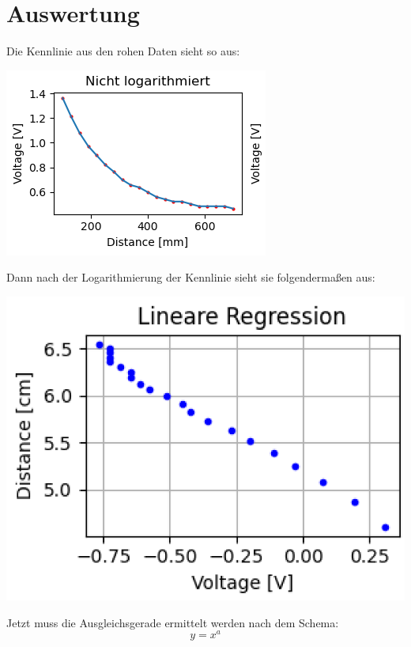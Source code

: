 \newpage
\section{Auswertung}
\label{chap:VERSUCH_2_AUSWERTUNG}
Die Kennlinie aus den rohen Daten sieht so aus:
	\begin{center}
		\includegraphics[scale=1.5]{media/dataV2.png}
	\end{center}
Dann nach der Logarithmierung der Kennlinie sieht sie folgendermaßen aus:
	\begin{center}
		\includegraphics[scale=1]{media/linReg.png}
	\end{center}


Jetzt muss die Ausgleichsgerade ermittelt werden nach dem Schema:
	\begin{equation}
  	y = x^a
	\end{equation}


